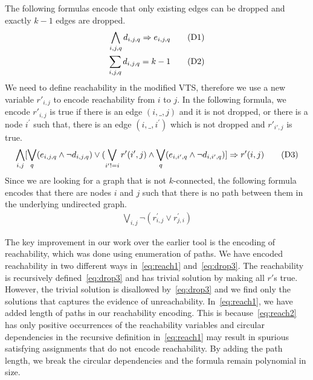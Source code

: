 The following formulas encode that only existing edges can be dropped
and exactly $k-1$ edges are dropped.
\begin{align}
  \bigwedge\limits_{i,j,q} d_{i,j,q} \Rightarrow e_{i,j,q}  \tag{D1}\label{eq:drop1}\\
  \sum_{i,j,q} d_{i,j,q} = k-1
  \tag{D2}\label{eq:drop2}
\end{align}
We need to define reachability in the modified VTS, therefore we use
a new variable $r'_{i,j}$ to encode reachability from $i$ to $j$.
In the following formula, we encode $r'_{i,j}$ is true if there is an
edge $(i,\_,j)$ and it is not dropped, or there is a node
$i^{\prime}$ such that, there is an edge $(i,\_,i^{\prime})$ which is
not dropped and $r'_{i',j}$ is true.
\begin{align}
\bigwedge\limits_{i,j}  [\bigvee_{q} (e_{i,j,q} \land  \neg d_{i,j,q}) \lor  (\bigvee_{i' != i}  r^{\prime}(i',j) \land  \bigvee_{q} (e_{i,i',q} \land \neg d_{i,i',q}) ] \Rightarrow r^{\prime}(i,j)  
  \tag{D3}\label{eq:drop3}
\end{align}
Since we are looking for a graph that is not $k$-connected,
the following formula encodes that there are nodes $i$ and $j$ such that
there is no path between them in the underlying undirected graph.
\begin{align}
   \bigvee\limits_{i,j} \neg (r^{\prime}_{i,j} \lor r^{\prime}_{j,i})
  \tag{D4}\label{eq:drop4}
\end{align}

The key improvement in our work over the earlier tool is the
encoding of reachability, which was done using enumeration of paths.
%
We have encoded reachability in two different ways in~\eqref{eq:reach1} and~\eqref{eq:drop3}.
%
The reachability is recursively defined~\eqref{eq:drop3} and has trivial solution by
making all $r'$s true.
%
However, the trivial solution is disallowed by~\eqref{eq:drop3} and we find only the
solutions that captures the evidence of unreachability.
%
In~\eqref{eq:reach1}, we have added length of paths in our reachability encoding.
%
This is because~\eqref{eq:reach2} has only positive occurrences of the reachability variables
and circular dependencies in the recursive definition in~\eqref{eq:reach1} 
may result in spurious satisfying assignments that do not encode reachability.
%
By adding the path length, we break the circular dependencies and the formula remain polynomial in size.


